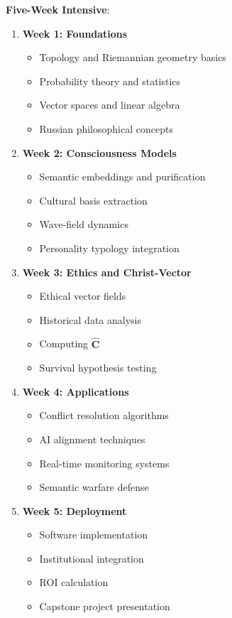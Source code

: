 \documentclass[11pt,a4paper]{article}
\theoremstyle{definition}
\theoremstyle{remark}
\begin{document}
\textbf{Five-Week Intensive}:
\begin{enumerate}
\item \textbf{Week 1: Foundations}
    \begin{itemize}
    \item Topology and Riemannian geometry basics
    \item Probability theory and statistics
    \item Vector spaces and linear algebra
    \item Russian philosophical concepts
    \end{itemize}

\item \textbf{Week 2: Consciousness Models}
    \begin{itemize}
    \item Semantic embeddings and purification
    \item Cultural basis extraction
    \item Wave-field dynamics
    \item Personality typology integration
    \end{itemize}

\item \textbf{Week 3: Ethics and Christ-Vector}
    \begin{itemize}
    \item Ethical vector fields
    \item Historical data analysis
    \item Computing \(\hat{\mathbf{C}}\)
    \item Survival hypothesis testing
    \end{itemize}

\item \textbf{Week 4: Applications}
    \begin{itemize}
    \item Conflict resolution algorithms
    \item AI alignment techniques
    \item Real-time monitoring systems
    \item Semantic warfare defense
    \end{itemize}

\item \textbf{Week 5: Deployment}
    \begin{itemize}
    \item Software implementation
    \item Institutional integration
    \item ROI calculation
    \item Capstone project presentation
    \end{itemize}
\end{enumerate}
\end{document}
